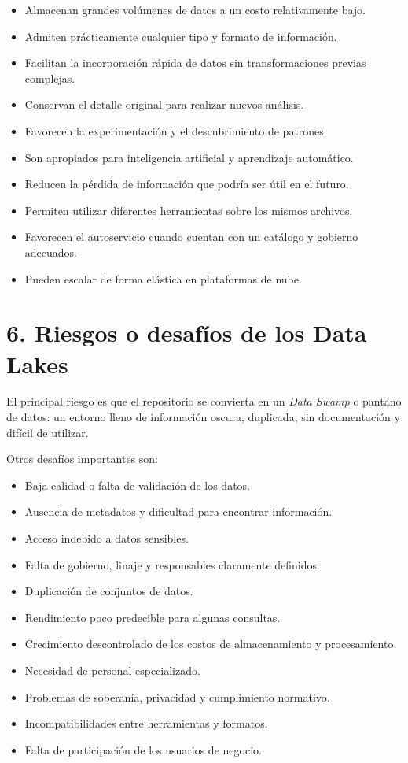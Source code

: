 \begin{itemize}
    \item Almacenan grandes volúmenes de datos a un costo relativamente bajo.
    \item Admiten prácticamente cualquier tipo y formato de información.
    \item Facilitan la incorporación rápida de datos sin transformaciones previas complejas.
    \item Conservan el detalle original para realizar nuevos análisis.
    \item Favorecen la experimentación y el descubrimiento de patrones.
    \item Son apropiados para inteligencia artificial y aprendizaje automático.
    \item Reducen la pérdida de información que podría ser útil en el futuro.
    \item Permiten utilizar diferentes herramientas sobre los mismos archivos.
    \item Favorecen el autoservicio cuando cuentan con un catálogo y gobierno adecuados.
    \item Pueden escalar de forma elástica en plataformas de nube.
\end{itemize}

\section*{6. Riesgos o desafíos de los Data Lakes}

El principal riesgo es que el repositorio se convierta en un \textit{Data
Swamp} o pantano de datos: un entorno lleno de información oscura, duplicada,
sin documentación y difícil de utilizar.

Otros desafíos importantes son:

\begin{itemize}
    \item Baja calidad o falta de validación de los datos.
    \item Ausencia de metadatos y dificultad para encontrar información.
    \item Acceso indebido a datos sensibles.
    \item Falta de gobierno, linaje y responsables claramente definidos.
    \item Duplicación de conjuntos de datos.
    \item Rendimiento poco predecible para algunas consultas.
    \item Crecimiento descontrolado de los costos de almacenamiento y procesamiento.
    \item Necesidad de personal especializado.
    \item Problemas de soberanía, privacidad y cumplimiento normativo.
    \item Incompatibilidades entre herramientas y formatos.
    \item Falta de participación de los usuarios de negocio.
\end{itemize}

